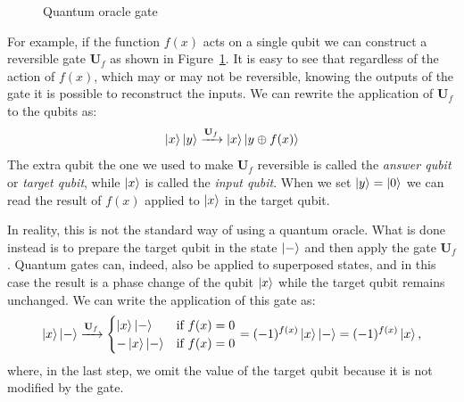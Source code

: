 \begin{figure}
	\centering
	\vspace{.3cm}
	\caption{Quantum oracle gate}
	\label{fig:oracle}
\end{figure}
For example, if the function $f(x)$ acts on a single qubit we can construct a reversible gate $\mathbf{U}_f$ as shown in Figure~\ref{fig:oracle}. It is easy to see that regardless of the action of $f(x)$, which may or may not be reversible, knowing the outputs of the gate it is possible to reconstruct the inputs. We can rewrite the application of $\mathbf{U}_f$ to the qubits as:
\[
\Ket{x}\Ket{y} \xrightarrow{\mathbf{U}_f} \Ket{x}\Ket{y \oplus f(x)}
\]
The extra qubit \textemdash{}the  one we used to make $\mathbf{U}_f$ reversible\textemdash{}  is called the \emph{answer qubit} or \emph{target qubit}, while $\Ket{x}$ is called the \emph{input qubit}. When we set $\Ket{y} = \Ket{0}$ we can read the result of $f(x)$ applied to $\Ket{x}$ in the target qubit.

In reality, this is not the standard way of using a quantum oracle. What is done instead is to prepare the target qubit in the state $\Ket{-}$ and then apply the gate $\mathbf{U}_f$. Quantum gates can, indeed, also be applied to superposed states, and in this case the result is a phase change of the qubit $\Ket{x}$ while the target qubit remains unchanged. We can write the application of this gate as:
\[
\Ket{x} \Ket{-}\xrightarrow{\mathbf{U}_f} 
\begin{cases}
	\Ket{x} \Ket{-} & \text{if $f(x)=0$} \\
	-\Ket{x} \Ket{-} & \text{if $f(x)=0$}
\end{cases} = 
(-1)^{f(x)}\Ket{x} \Ket{-} = (-1)^{f(x)}\Ket{x},
\]
where, in the last step, we omit the value of the target qubit because it is not modified by the gate.

